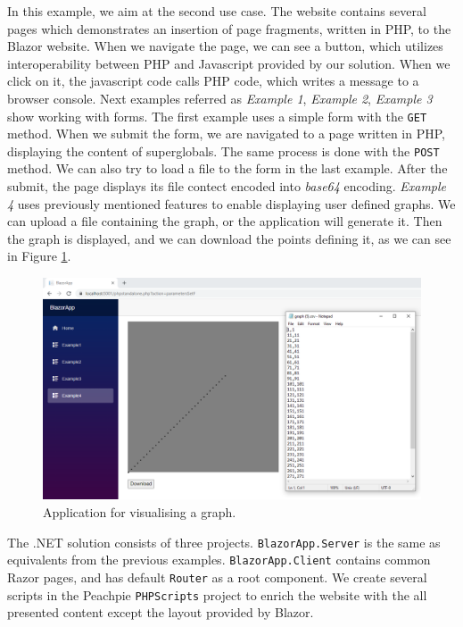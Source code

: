 In this example, we aim at the second use case.
The website contains several pages which demonstrates an insertion of page fragments, written in PHP, to the Blazor website.
When we navigate the page, we can see a button, which utilizes interoperability between PHP and Javascript provided by our solution.
When we click on it, the javascript code calls PHP code, which writes a message to a browser console.
Next examples referred as \textit{Example 1}, \textit{Example 2}, \textit{Example 3} show working with forms.
The first example uses a simple form with the \texttt{GET} method.
When we submit the form, we are navigated to a page written in PHP, displaying the content of superglobals.
The same process is done with the \texttt{POST} method.
We can also try to load a file to the form in the last example.
After the submit, the page displays its file contect encoded into \textit{base64} encoding.
\textit{Example 4} uses previously mentioned features to enable displaying user defined graphs.
We can upload a file containing the graph, or the application will generate it.
Then the graph is displayed, and we can download the points defining it, as we can see in Figure \ref{img27:graph}.
\par
\begin{figure}\centering
\includegraphics[scale=0.4]{./img/graph}
\caption{Application for visualising a graph.}
\label{img27:graph}
\end{figure} 
\par
The .NET solution consists of three projects.
\texttt{BlazorApp.Server} is the same as equivalents from the previous examples.
\texttt{BlazorApp.Client} contains common Razor pages, and has default \texttt{Router} as a root component.
We create several scripts in the Peachpie \texttt{PHPScripts} project to enrich the website with the all presented content except the layout provided by Blazor.
